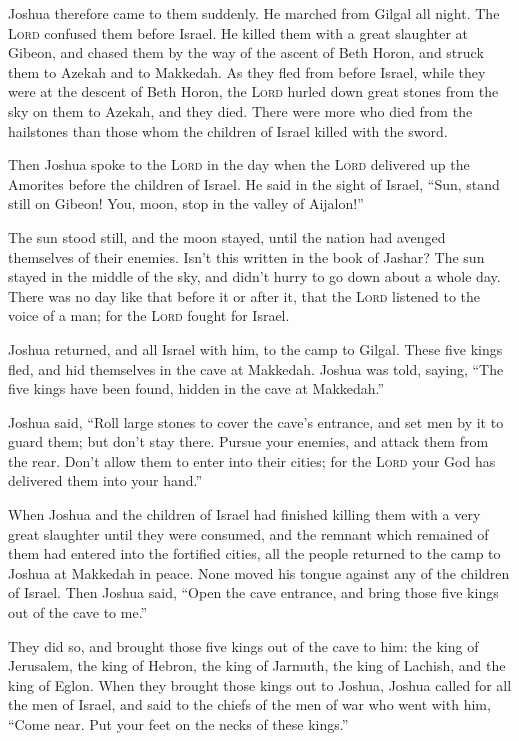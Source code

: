  Joshua therefore came to them suddenly. He marched from
Gilgal all night.  The \textsc{Lord} confused them before
Israel. He killed them with a great slaughter at Gibeon, and chased them
by the way of the ascent of Beth Horon, and struck them to Azekah and to
Makkedah.  As they fled from before Israel, while they
were at the descent of Beth Horon, the \textsc{Lord} hurled down great
stones from the sky on them to Azekah, and they died. There were more
who died from the hailstones than those whom the children of Israel
killed with the sword.

 Then Joshua spoke to the \textsc{Lord} in the day when
the \textsc{Lord} delivered up the Amorites before the children of
Israel. He said in the sight of Israel, ``Sun, stand still on Gibeon!
You, moon, stop in the valley of Aijalon!''

 The sun stood still, and the moon stayed, until the
nation had avenged themselves of their enemies. Isn't this written in
the book of Jashar? The sun stayed in the middle of the sky, and didn't
hurry to go down about a whole day.  There was no day
like that before it or after it, that the \textsc{Lord} listened to the
voice of a man; for the \textsc{Lord} fought for Israel.

 Joshua returned, and all Israel with him, to the camp to
Gilgal.  These five kings fled, and hid themselves in the
cave at Makkedah.  Joshua was told, saying, ``The five
kings have been found, hidden in the cave at Makkedah.''

 Joshua said, ``Roll large stones to cover the cave's
entrance, and set men by it to guard them;  but don't
stay there. Pursue your enemies, and attack them from the rear. Don't
allow them to enter into their cities; for the \textsc{Lord} your God
has delivered them into your hand.''

 When Joshua and the children of Israel had finished
killing them with a very great slaughter until they were consumed, and
the remnant which remained of them had entered into the fortified
cities,  all the people returned to the camp to Joshua at
Makkedah in peace. None moved his tongue against any of the children of
Israel.  Then Joshua said, ``Open the cave entrance, and
bring those five kings out of the cave to me.''

 They did so, and brought those five kings out of the
cave to him: the king of Jerusalem, the king of Hebron, the king of
Jarmuth, the king of Lachish, and the king of Eglon. 
When they brought those kings out to Joshua, Joshua called for all the
men of Israel, and said to the chiefs of the men of war who went with
him, ``Come near. Put your feet on the necks of these kings.''

